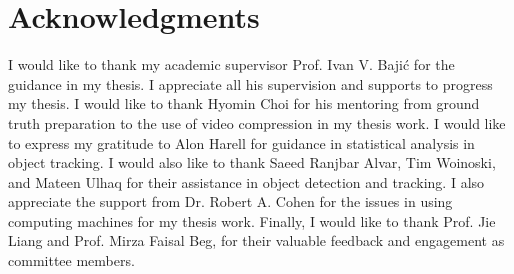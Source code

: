 \chapter*{Acknowledgments}

I would like to thank my academic supervisor Prof. Ivan V. Bajić for the guidance in my thesis. I appreciate all his supervision and supports to progress my thesis. I would like to thank Hyomin Choi for his mentoring from ground truth preparation to the use of video compression in my thesis work. I would like to express my gratitude to Alon Harell for guidance in statistical analysis in object tracking. I would also like to thank Saeed Ranjbar Alvar, Tim Woinoski, and Mateen Ulhaq for their assistance in object detection and tracking. I also appreciate the support from Dr. Robert A. Cohen for the issues in using computing machines for my thesis work. Finally, I would like to thank Prof. Jie Liang and Prof. Mirza Faisal Beg, for their valuable feedback and engagement as committee members.